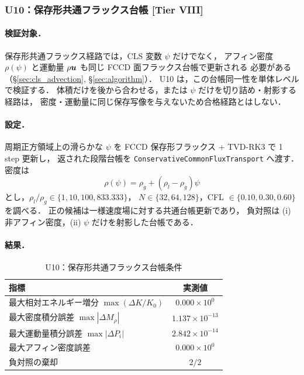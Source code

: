 %
\subsubsection{U10：保存形共通フラックス台帳 [Tier VIII]}
\label{sec:U10_common_flux_ledger}

\paragraph{検証対象．}
保存形共通フラックス経路では，CLS 変数 $\psi$ だけでなく，
アフィン密度 $\rho(\psi)$ と運動量 $\rho\bm{u}$ も同じ FCCD 面フラックス台帳で更新される
必要がある（§\ref{sec:cls_advection}, §\ref{sec:algorithm}）．
U10 は，この台帳同一性を単体レベルで検証する．
体積だけを後から合わせる，または $\psi$ だけを切り詰め・射影する経路は，
密度・運動量に同じ保存写像を与えないため合格経路とはしない．

\paragraph{設定．}
周期正方領域上の滑らかな $\psi$ を FCCD 保存形フラックス + TVD-RK3 で 1 step 更新し，
返された段階台帳を \texttt{ConservativeCommonFluxTransport} へ渡す．
密度は
\[
  \rho(\psi)=\rho_g+(\rho_l-\rho_g)\psi
\]
とし，$\rho_l/\rho_g\in\{1,10,100,833.333\}$，
$N\in\{32,64,128\}$，CFL $\in\{0.10,0.30,0.60\}$ を調べる．
正の候補は一様速度場に対する共通台帳更新であり，
負対照は (i) 非アフィン密度，(ii) $\psi$ だけを射影した台帳である．

\paragraph{結果．}

\begin{table}[!ht]
\caption{U10：保存形共通フラックス台帳条件}
\label{tab:U10_common_flux_ledger}
\centering\small
\begin{tabular}{l c}
\toprule
指標 & 実測値 \\
\midrule
最大相対エネルギー増分 $\max(\Delta K/K_0)$ & $0.000\times10^{0}$ \\
最大密度積分誤差 $\max|\Delta M_\rho|$ & $1.137\times10^{-13}$ \\
最大運動量積分誤差 $\max|\Delta P_i|$ & $2.842\times10^{-14}$ \\
最大アフィン密度誤差 & $0.000\times10^{0}$ \\
負対照の棄却 & $2/2$ \\
\bottomrule
\end{tabular}
\end{table}

